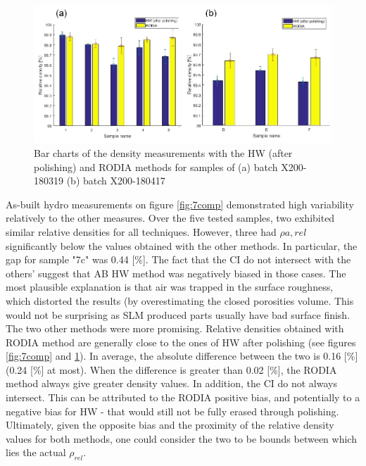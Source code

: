 \begin{figure}[ht]
	\centering
	\centerline{\includegraphics[scale=0.64]{Images/2comp}}
	\decoRule
	\caption[Bar charts of the density measurements with the HW (after polishing) and RODIA methods for samples of (a) batch X200-180319 (b) batch X200-180417]{Bar charts of the density measurements with the HW (after polishing) and RODIA methods for samples of (a) batch X200-180319 (b) batch X200-180417}
	\label{fig:2comp}
\end{figure}

As-built hydro measurements on figure \ref{fig:7comp} demonstrated high variability relatively to the other measures. Over the five tested samples, two exhibited similar relative densities for all techniques. However, three had $\rho{a,rel}$ significantly below the values obtained with the other methods. In particular, the gap for sample "7c" was 0.44 [\%]. The fact that the CI do not intersect with the others' suggest that AB HW method was negatively biased in those cases. The most plausible explanation is that air was trapped in the surface roughness, which distorted the results (by overestimating the closed porosities volume. This would not be surprising as SLM produced parts usually have bad surface finish.\\ %

The two other methods were more promising. Relative densities obtained with RODIA method are generally close to the ones of HW after polishing (see figures \ref{fig:7comp} and \ref{fig:2comp}). In average, the absolute difference between the two is 0.16 [\%] (0.24 [\%] at most).  When the difference is greater than 0.02 [\%], the RODIA method always give greater density values. In addition, the CI do not always intersect. This can be attributed to the RODIA positive bias, and potentially to a negative bias for HW - that would still not be fully erased through polishing. Ultimately, given the opposite bias and the proximity of the relative density values for both methods, one could consider the two to be bounds between which lies the actual $\rho_{rel}$.\\

